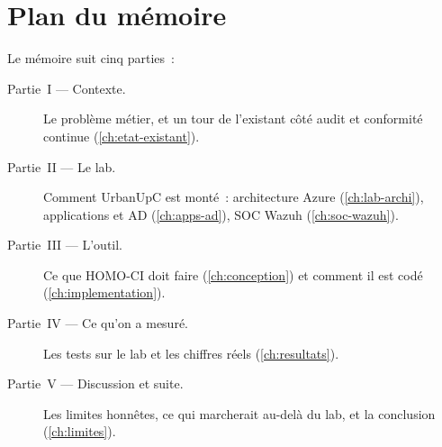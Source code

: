 \section{Plan du mémoire}

Le mémoire suit cinq parties~:

\begin{description}
  \item[Partie~I --- Contexte.] Le problème métier, et un tour de
    l'existant côté audit et conformité continue
    (\cref{ch:etat-existant}).
  \item[Partie~II --- Le lab.] Comment UrbanUpC est monté~:
    architecture Azure (\cref{ch:lab-archi}), applications et AD
    (\cref{ch:apps-ad}), SOC Wazuh (\cref{ch:soc-wazuh}).
  \item[Partie~III --- L'outil.] Ce que HOMO-CI doit faire
    (\cref{ch:conception}) et comment il est codé
    (\cref{ch:implementation}).
  \item[Partie~IV --- Ce qu'on a mesuré.] Les tests sur le lab et
    les chiffres réels (\cref{ch:resultats}).
  \item[Partie~V --- Discussion et suite.] Les limites honnêtes,
    ce qui marcherait au-delà du lab, et la conclusion
    (\cref{ch:limites}).
\end{description}

